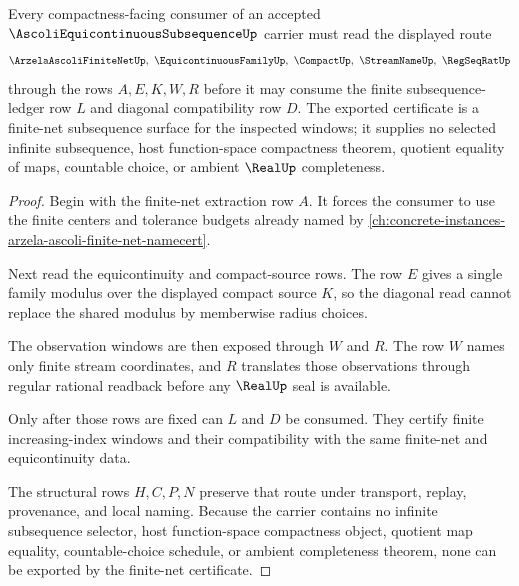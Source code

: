 \begin{theorem}
\label{thm:ascoli-equicontinuous-subsequence-finite-net-extraction}
Every compactness-facing consumer of an accepted $\AscoliEquicontinuousSubsequenceUp$ carrier must read the displayed route
$$
\ArzelaAscoliFiniteNetUp,\ \EquicontinuousFamilyUp,\ \CompactUp,\ \StreamNameUp,\ \RegSeqRatUp
$$
through the rows $A,E,K,W,R$ before it may consume the finite subsequence-ledger row $L$ and diagonal compatibility row $D$. The exported certificate is a finite-net subsequence surface for the inspected windows; it supplies no selected infinite subsequence, host function-space compactness theorem, quotient equality of maps, countable choice, or ambient $\RealUp$ completeness.
\end{theorem}
\begin{proof}
Begin with the finite-net extraction row $A$. It forces the consumer to use the finite centers and tolerance budgets already named by \autoref{ch:concrete-instances-arzela-ascoli-finite-net-namecert}.

Next read the equicontinuity and compact-source rows. The row $E$ gives a single family modulus over the displayed compact source $K$, so the diagonal read cannot replace the shared modulus by memberwise radius choices.

The observation windows are then exposed through $W$ and $R$. The row $W$ names only finite stream coordinates, and $R$ translates those observations through regular rational readback before any $\RealUp$ seal is available.

Only after those rows are fixed can $L$ and $D$ be consumed. They certify finite increasing-index windows and their compatibility with the same finite-net and equicontinuity data.

The structural rows $H,C,P,N$ preserve that route under transport, replay, provenance, and local naming. Because the carrier contains no infinite subsequence selector, host function-space compactness object, quotient map equality, countable-choice schedule, or ambient completeness theorem, none can be exported by the finite-net certificate.
\end{proof}


